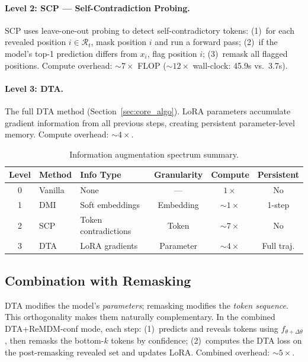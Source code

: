 \documentclass{article}
\begin{document}
\paragraph{Level 2: SCP --- Self-Contradiction Probing.}
SCP uses leave-one-out probing to detect self-contradictory tokens:
(1)~for each revealed position $i \in \mathcal{R}_t$, mask position $i$ and run a forward pass;
(2)~if the model's top-1 prediction differs from $x_i$, flag position $i$;
(3)~remask all flagged positions.
Compute overhead: ${\sim}7{\times}$ FLOP (${\sim}12{\times}$ wall-clock: 45.9s vs.\ 3.7s).

\paragraph{Level 3: DTA.}
The full DTA method (Section~\ref{sec:core_algo}). LoRA parameters accumulate gradient information from all previous steps, creating persistent parameter-level memory. Compute overhead: ${\sim}4{\times}$.

\begin{table}[t]
\centering
\caption{Information augmentation spectrum summary.}
\label{tab:spectrum}
\small
\begin{tabular}{cllccc}
\toprule
\textbf{Level} & \textbf{Method} & \textbf{Info Type} & \textbf{Granularity} & \textbf{Compute} & \textbf{Persistent} \\
\midrule
0 & Vanilla & None & --- & $1{\times}$ & No \\
1 & DMI & Soft embeddings & Embedding & ${\sim}1{\times}$ & 1-step \\
2 & SCP & Token contradictions & Token & ${\sim}7{\times}$ & No \\
3 & DTA & LoRA gradients & Parameter & ${\sim}4{\times}$ & Full traj. \\
\bottomrule
\end{tabular}
\end{table}

\subsection{Combination with Remasking}
\label{sec:combination}

DTA modifies the model's \emph{parameters}; remasking modifies the \emph{token sequence}. This orthogonality makes them naturally complementary. In the combined DTA+ReMDM-conf mode, each step: (1)~predicts and reveals tokens using $f_{\theta + \Delta\theta}$, then remasks the bottom-$k$ tokens by confidence; (2)~computes the DTA loss on the post-remasking revealed set and updates LoRA. Combined overhead: ${\sim}5{\times}$.
\end{document}
